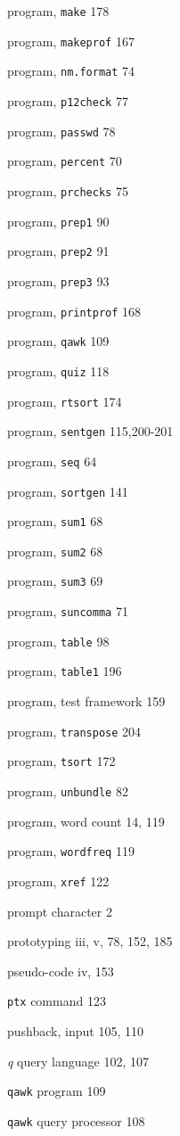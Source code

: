 \begin{multicols}{3}
program, \verb'make' 178

program, \verb'makeprof' 167

program, \verb'nm.format' 74

program, \verb'p12check' 77

program, \verb'passwd' 78

program, \verb'percent' 70

program, \verb'prchecks' 75

program, \verb'prep1' 90

program, \verb'prep2' 91

program, \verb'prep3' 93

program, \verb'printprof' 168

program, \verb'qawk' 109

program, \verb'quiz' 118

program, \verb'rtsort' 174

program, \verb'sentgen' 115,200-201

program, \verb'seq' 64

program, \verb'sortgen' 141

program, \verb'sum1' 68

program, \verb'sum2' 68

program, \verb'sum3' 69



program, \verb'suncomma' 71

program, \verb'table' 98

program, \verb'table1' 196

program, test framework 159

program, \verb'transpose' 204

program, \verb'tsort' 172

program, \verb'unbundle' 82

program, word count 14, 119

program, \verb'wordfreq' 119

program, \verb'xref' 122

prompt character 2

prototyping iii, v, 78, 152, 185

pseudo-code iv, 153

\verb'ptx' command 123

pushback, input 105, 110

\textit{q} query language 102, 107

\verb'qawk' program 109

\verb'qawk' query processor 108


\end{multicols}
